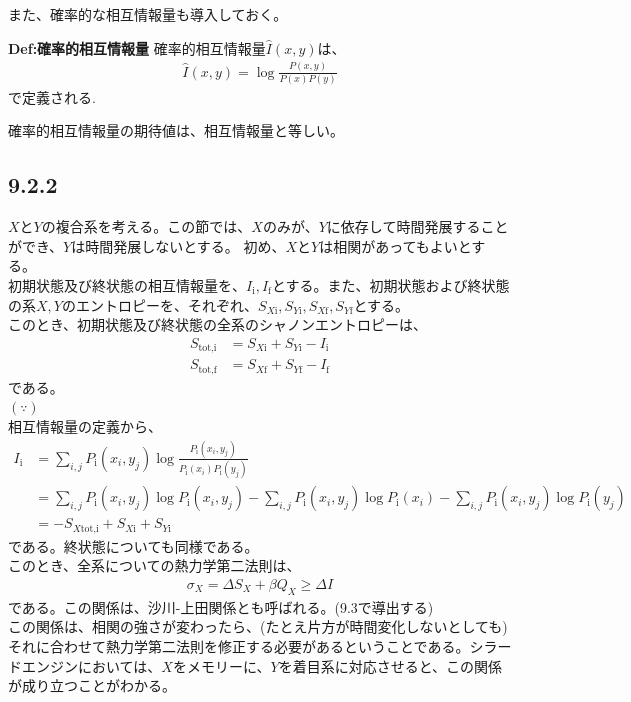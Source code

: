 \documentclass[a4paper,11pt]{jsarticle}
\numberwithin{equation}{section}
\begin{document}
また、確率的な相互情報量も導入しておく。
\begin{itembox}[l]{\textbf{Def:確率的相互情報量}}
        確率的相互情報量$\hat{I}(x,y)$は、
        \begin{align}
                \hat{I}(x,y) = \log\frac{P(x,y)}{P(x)P(y)}
        \end{align}
        で定義される.

\end{itembox}
確率的相互情報量の期待値は、相互情報量と等しい。\\

\subsection*{9.2.2}
$X$と$Y$の複合系を考える。この節では、$X$のみが、$Y$に依存して時間発展することができ、$Y$は時間発展しないとする。
初め、$X$と$Y$は相関があってもよいとする。\\
初期状態及び終状態の相互情報量を、$I_{\text{i}},I_{\text{f}}$とする。また、初期状態および終状態の系$X,Y$のエントロピーを、それぞれ、$S_{X\text{i}},S_{Y\text{i}},S_{X\text{f}},S_{Y\text{f}}$とする。\\
このとき、初期状態及び終状態の全系のシャノンエントロピーは、
\begin{align}
    S_{\text{tot,i}} &= S_{X\text{i}} + S_{Y\text{i}} - I_{\text{i}} \\
    S_{\text{tot,f}} &= S_{X\text{f}} + S_{Y\text{f}} - I_{\text{f}}
\end{align}
である。\\
$(\because)$\\
相互情報量の定義から、
\begin{align}
    I_{\text{i}} &= \sum_{i,j}P_{\text{i}}(x_i,y_j)\log\frac{P_{\text{i}}(x_i,y_j)}{P_{\text{i}}(x_i)P_{\text{i}}(y_j)} \\
    &= \sum_{i,j}P_{\text{i}}(x_i,y_j)\log P_{\text{i}}(x_i,y_j) - \sum_{i,j}P_{\text{i}}(x_i,y_j)\log P_{\text{i}}(x_i) - \sum_{i,j}P_{\text{i}}(x_i,y_j)\log P_{\text{i}}(y_j) \\
    &= -S_{X\text{tot,i}}  + S_{X\text{i}} + S_{Y\text{i}}
\end{align}
である。終状態についても同様である。\hfill\qedsymbol\\


このとき、全系についての熱力学第二法則は、
\begin{align}
    \sigma_X = \Delta S_X +\beta Q_X \geq \Delta I
\end{align}
である。この関係は、沙川-上田関係とも呼ばれる。(9.3で導出する)\\
この関係は、相関の強さが変わったら、(たとえ片方が時間変化しないとしても)それに合わせて熱力学第二法則を修正する必要があるということである。シラードエンジンにおいては、$X$をメモリーに、$Y$を着目系に対応させると、この関係が成り立つことがわかる。\\
\end{document}
